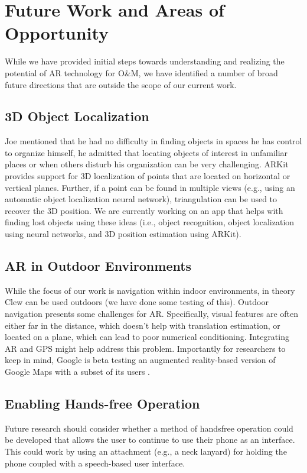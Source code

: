 \documentclass[chi]{sigchi}
\newcommand{\OM}{O\&M\xspace}
\begin{document}
\section{Future Work and Areas of Opportunity}
While we have provided initial steps towards understanding and realizing the potential of AR technology for \OM, we have identified a number of broad future directions that are outside the scope of our current work.

\subsection{3D Object Localization}

Joe mentioned that he had no difficulty in finding objects in spaces he has control to organize himself, he admitted that locating objects of interest in unfamiliar places or when others disturb his organization can be very challenging.  ARKit provides support for 3D localization of points that are located on horizontal or vertical planes.  Further, if a point can be found in multiple views (e.g., using an automatic object localization neural network), triangulation can be used to recover the 3D position.  We are currently working on an app that helps with finding lost objects using these ideas (i.e., object recognition, object localization using neural networks, and 3D position estimation using ARKit).

\subsection{AR in Outdoor Environments}
While the focus of our work is navigation within indoor environments, in theory Clew can be used outdoors (we have done some testing of this).  Outdoor navigation presents some challenges for AR.  Specifically, visual features are often either far in the distance, which doesn't help with translation estimation, or located on a plane, which can lead to poor numerical conditioning.  Integrating AR and GPS might help address this problem.  Importantly for researchers to keep in mind, Google is beta testing an augmented reality-based version of Google Maps with a subset of its users \cite{gmapAR}.

\subsection{Enabling Hands-free Operation} 
Future research should consider whether a method of handsfree operation could be developed that allows the user to continue to use their phone as an interface.  This could work by using an attachment (e.g., a neck lanyard) for holding the phone coupled with a speech-based user interface. %
\end{document}
